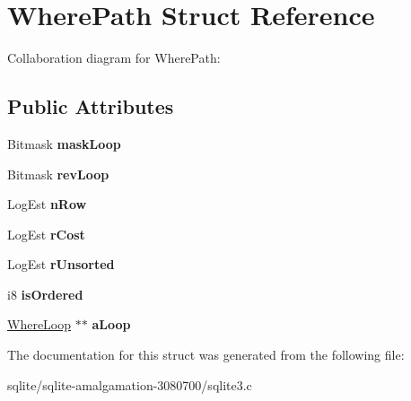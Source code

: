 \hypertarget{struct_where_path}{\section{Where\+Path Struct Reference}
\label{struct_where_path}
}


Collaboration diagram for Where\+Path\+:
\subsection*{Public Attributes}
\begin{DoxyCompactItemize}
\item 
\hypertarget{struct_where_path_a4a0a59d31e51c3a8f9fdfdbfb384ab73}{Bitmask {\bfseries mask\+Loop}}\label{struct_where_path_a4a0a59d31e51c3a8f9fdfdbfb384ab73}

\item 
\hypertarget{struct_where_path_a6f6bf0a804430fb08f4aadc506f5cc14}{Bitmask {\bfseries rev\+Loop}}\label{struct_where_path_a6f6bf0a804430fb08f4aadc506f5cc14}

\item 
\hypertarget{struct_where_path_ab9e893b128d34fc8bc832de593387c99}{Log\+Est {\bfseries n\+Row}}\label{struct_where_path_ab9e893b128d34fc8bc832de593387c99}

\item 
\hypertarget{struct_where_path_a8ca2a9ddc42527170167eb6f08d85878}{Log\+Est {\bfseries r\+Cost}}\label{struct_where_path_a8ca2a9ddc42527170167eb6f08d85878}

\item 
\hypertarget{struct_where_path_a69b10c1c4a8e00814f80144dad12c4ad}{Log\+Est {\bfseries r\+Unsorted}}\label{struct_where_path_a69b10c1c4a8e00814f80144dad12c4ad}

\item 
\hypertarget{struct_where_path_a2793b5b50bc1ec2cf8f9c6e5744c2826}{i8 {\bfseries is\+Ordered}}\label{struct_where_path_a2793b5b50bc1ec2cf8f9c6e5744c2826}

\item 
\hypertarget{struct_where_path_a63e12088b414ce0b0b1ee43655733dd1}{\hyperlink{struct_where_loop}{Where\+Loop} $\ast$$\ast$ {\bfseries a\+Loop}}\label{struct_where_path_a63e12088b414ce0b0b1ee43655733dd1}

\end{DoxyCompactItemize}


The documentation for this struct was generated from the following file\+:\begin{DoxyCompactItemize}
\item 
sqlite/sqlite-\/amalgamation-\/3080700/sqlite3.\+c\end{DoxyCompactItemize}
